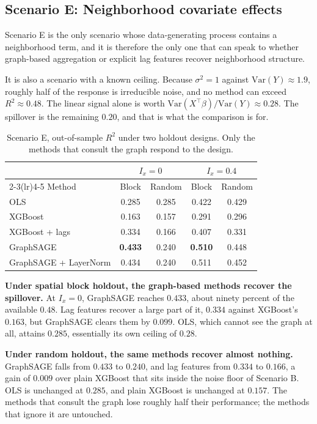 \documentclass[ASNA, twocolumn]{USG} %
\begin{document}
\subsection{Scenario E: Neighborhood covariate effects}

Scenario E is the only scenario whose data-generating process contains a neighborhood term, and it is therefore the only one that can speak to whether graph-based aggregation or explicit lag features recover neighborhood structure.

It is also a scenario with a known ceiling. Because \(\sigma^2 = 1\) against \(\mathrm{Var}(Y) \approx 1.9\), roughly half of the response is irreducible noise, and no method can exceed \(R^2 \approx 0.48\). The linear signal alone is worth \(\mathrm{Var}(X^\top\beta)/\mathrm{Var}(Y) \approx 0.28\). The spillover is the remaining \(0.20\), and that is what the comparison is for.

\begin{table}[t]
\centering
\caption{Scenario E, out-of-sample \(R^2\) under two holdout designs. Only the methods that consult the graph respond to the design.}
\label{tab:scenario_e}
\begin{tabular}{lcccc}
\toprule
& \multicolumn{2}{c}{\(I_x=0\)} & \multicolumn{2}{c}{\(I_x=0.4\)} \\
\cmidrule(lr){2-3}\cmidrule(lr){4-5}
Method & Block & Random & Block & Random \\
\midrule
OLS & 0.285 & 0.285 & 0.422 & 0.429 \\
XGBoost & 0.163 & 0.157 & 0.291 & 0.296 \\
XGBoost + lags & 0.334 & 0.166 & 0.407 & 0.331 \\
GraphSAGE & \textbf{0.433} & 0.240 & \textbf{0.510} & 0.448 \\
GraphSAGE + LayerNorm & 0.434 & 0.240 & 0.511 & 0.452 \\
\bottomrule
\end{tabular}
\end{table}

\textbf{Under spatial block holdout, the graph-based methods recover the spillover.} At \(I_x=0\), GraphSAGE reaches \(0.433\), about ninety percent of the available \(0.48\). Lag features recover a large part of it, \(0.334\) against XGBoost's \(0.163\), but GraphSAGE clears them by \(0.099\). OLS, which cannot see the graph at all, attains \(0.285\), essentially its own ceiling of \(0.28\).

\textbf{Under random holdout, the same methods recover almost nothing.} GraphSAGE falls from \(0.433\) to \(0.240\), and lag features from \(0.334\) to \(0.166\), a gain of \(0.009\) over plain XGBoost that sits inside the noise floor of Scenario B. OLS is unchanged at \(0.285\), and plain XGBoost is unchanged at \(0.157\). The methods that consult the graph lose roughly half their performance; the methods that ignore it are untouched.
\end{document}
